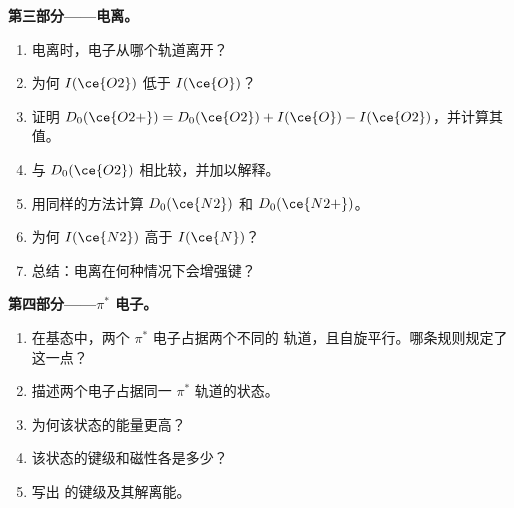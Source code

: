 \begin{problem}
\medskip
\noindent\textbf{第三部分——电离。}
\begin{enumerate}[resume]
  \item {} 电离时，电子从哪个轨道离开？
  \item 为何 $I(\ce{O2})$ 低于 $I(\ce{O})$？
  \item 证明 $D_0(\ce{O2+}) = D_0(\ce{O2}) + I(\ce{O}) - I(\ce{O2})$，并计算其值。
  \item 与 $D_0(\ce{O2})$ 相比较，并加以解释。
  \item 用同样的方法计算 $D_0(\ce{N2})$ 和 $D_0(\ce{N2+})$。
  \item 为何 $I(\ce{N2})$ 高于 $I(\ce{N})$？
  \item 总结：电离在何种情况下会增强键？
\end{enumerate}

\medskip
\noindent\textbf{第四部分——$\pi^*$ 电子。}
\begin{enumerate}[resume]
  \item 在基态中，两个 $\pi^*$ 电子占据两个不同的
        轨道，且自旋平行。哪条规则规定了这一点？
  \item 描述两个电子占据同一 $\pi^*$ 轨道的状态。
  \item 为何该状态的能量更高？
  \item 该状态的键级和磁性各是多少？
  \item 写出  的键级及其解离能。
\end{enumerate}
\end{problem}
